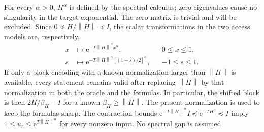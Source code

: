 \documentclass[aps,pra,reprint,floatfix,unsortedaddress,superscriptaddress]{revtex4-2}
\newcommand{\norm}[1]{\left\lVert#1\right\rVert}
\begin{document}
For every $\alpha>0$, $H^\alpha$ is defined by the spectral calculus;
zero eigenvalues cause no singularity in the target exponential.
The zero matrix is trivial and will be excluded.  Since
$0\preceq H/\norm{H}\preceq I$, the scalar transformations in the two
access models are, respectively,
\begin{equation}
\begin{aligned}
    x&\longmapsto
    \mathrm e^{-T\norm{H}^{\alpha}x^\alpha},
    &&0\leq x\leq1,\\
    s&\longmapsto
    \mathrm e^{-T\norm{H}^{\alpha}[(1+s)/2]^\alpha},
    &&-1\leq s\leq1.
\end{aligned}
    \label{eq:normalized_target}
\end{equation}
If only a block encoding with a known normalization larger than
$\norm{H}$ is available, every statement remains valid after replacing
$\norm{H}$ by that normalization in both the oracle and the formulas.
In particular, the shifted block is then $2H/\beta_H-I$ for a known
$\beta_H\geq\norm{H}$.  The present normalization is used to keep the
formulas sharp.
The contraction bounds
$\mathrm e^{-T\norm{H}^{\alpha}}I\preceq
\mathrm e^{-T H^\alpha}\preceq I$ imply
$1\leq u_r\leq\mathrm e^{T\norm{H}^{\alpha}}$ for every nonzero
input.  No spectral gap is assumed.
\end{document}

